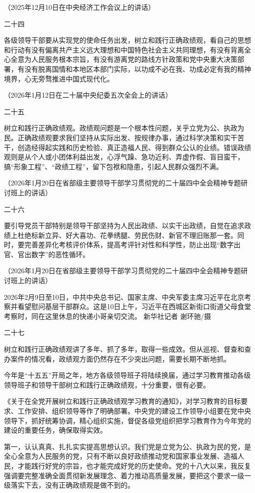 \documentclass[UTF8,zihao=-4]{ctexart}
\begin{document}
（2025年12月10日在中央经济工作会议上的讲话）

二十四

各级领导干部要从实现党的使命任务出发，树立和践行正确政绩观，看自己的思想和行动有没有偏离共产主义远大理想和中国特色社会主义共同理想，有没有背离全心全意为人民服务根本宗旨，有没有游离党的路线方针政策和党中央重大决策部署，有没有脱离国情和本地区本部门实际，以功成不必在我、功成必定有我的精神境界，心无旁骛推进中国式现代化。

（2026年1月12日在二十届中央纪委五次全会上的讲话）

二十五

树立和践行正确政绩观。政绩观问题是一个根本性问题，关乎立党为公、执政为民。正确政绩观要求我们坚持从实际出发、按规律办事，通过科学决策和实干苦干，创造经得起实践和历史检验、真正造福人民、得到群众公认的业绩。错误政绩观则是从个人或小团体利益出发，心浮气躁、急功近利、弄虚作假、盲目蛮干，搞“形象工程”、“政绩工程”，留下包袱和隐患，引起人民群众强烈不满。

（2026年1月20日在省部级主要领导干部学习贯彻党的二十届四中全会精神专题研讨班上的讲话）

二十六

要引导党员干部特别是领导干部坚持为人民出政绩、以实干出政绩，自觉在追求政绩上杜绝标新立异、好大喜功、花拳绣腿、劳民伤财、新官不理旧账那一套。同时，要完善差异化考核评价体系，提高考评针对性和科学性，防止出现“数字出官、官出数字”的恶性循环。

（2026年1月20日在省部级主要领导干部学习贯彻党的二十届四中全会精神专题研讨班上的讲话）

2026年2月9日至10日，中共中央总书记、国家主席、中央军委主席习近平在北京考察并看望慰问基层干部群众。这是10日上午，习近平在西城区新街口街道父母食堂考察时，同在这里休息的快递小哥亲切交流。 新华社记者 谢环驰/摄

二十七

树立和践行正确政绩观讲了多年、抓了多年，取得一些成效。但从巡视、督查和查办案件的情况看，政绩观方面仍然存在不少突出问题，需要长期不断地抓。

今年是“十五五”开局之年，地方各级领导班子将陆续换届，通过学习教育推动各级领导班子和领导干部树立和践行正确政绩观，十分重要，很有必要。

《关于在全党开展树立和践行正确政绩观学习教育的通知》，对学习教育的目标要求、工作安排、组织领导等作了明确部署。中央党的建设工作领导小组要在党中央领导下，抓好统筹协调，精心组织实施，督促各级党组织把学习教育作为今年党的建设的重要任务，确保取得实效。

第一，认认真真、扎扎实实提高思想认识。我们党是立党为公、执政为民的党，是全心全意为人民服务的党，只有不断以良好政绩推动党和国家事业发展、造福人民，才能践行好党的宗旨，也才能完成好党的历史使命。党的十八大以来，我反复强调要完整准确全面贯彻新发展理念、着力推动高质量发展，要把这个要求一级一级落实下去，没有正确政绩观是做不到的。
\end{document}
